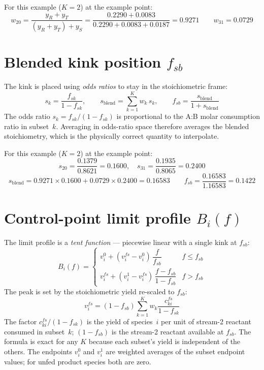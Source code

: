 \documentclass[11pt]{article}
\newcommand{\fsb}{f_{sb}}
\newcommand{\fsk}{f_{sk}}
\begin{document}
For this example ($K=2$) at the example point:
\[
  w_{20} = \frac{y_R + y_T}{(y_R + y_T) + y_S}
          = \frac{0.2290 + 0.0083}{0.2290 + 0.0083 + 0.0187} = 0.9271
  \qquad
  w_{31} = 0.0729
\]

\section{Blended kink position $\fsb$}

The kink is placed using \emph{odds ratios} to stay in the stoichiometric frame:
\begin{equation}
  s_k = \frac{\fsk}{1-\fsk},
  \qquad
  s_\mathrm{blend} = \sum_{k=1}^{K} w_k\,s_k,
  \qquad
  \fsb = \frac{s_\mathrm{blend}}{1+s_\mathrm{blend}}
  \label{eq:kink}
\end{equation}
The odds ratio $s_k = \fsk/(1-\fsk)$ is proportional to the A:B molar consumption ratio
in subset~$k$.  Averaging in odds-ratio space therefore averages the blended
stoichiometry, which is the physically correct quantity to interpolate.

For this example ($K=2$) at the example point:
\[
  s_{20} = \frac{0.1379}{0.8621} = 0.1600,
  \quad
  s_{31} = \frac{0.1935}{0.8065} = 0.2400
\]
\[
  s_\mathrm{blend} = 0.9271\times 0.1600 + 0.0729\times 0.2400 = 0.16583
  \qquad
  \fsb = \frac{0.16583}{1.16583} = 0.1422
\]

\section{Control-point limit profile $B_i(f)$}

The limit profile is a \emph{tent function} --- piecewise linear with a single kink
at $\fsb$:
\begin{equation}
  B_i(f) = \begin{cases}
    v^0_i + (v^{fs}_i - v^0_i)\,\dfrac{f}{\fsb} & f \le \fsb \\[8pt]
    v^{fs}_i + (v^1_i - v^{fs}_i)\,\dfrac{f-\fsb}{1-\fsb} & f > \fsb
  \end{cases}
  \label{eq:tent}
\end{equation}
The peak is set by the stoichiometric yield re-scaled to $\fsb$:
\begin{equation}
  v^{fs}_i = (1-\fsb)\sum_{k=1}^{K} w_k \frac{c^{fs}_{ki}}{1-\fsk}
  \label{eq:peak}
\end{equation}
The factor $c^{fs}_{ki}/(1-\fsk)$ is the yield of species~$i$ per unit of stream-2
reactant consumed in subset~$k$; $(1-\fsb)$ is the stream-2 reactant available at
$\fsb$.  The formula is exact for any $K$ because each subset's yield is independent of
the others.  The endpoints $v^0_i$ and $v^1_i$ are weighted averages of the subset
endpoint values; for unfed product species both are zero.
\end{document}
